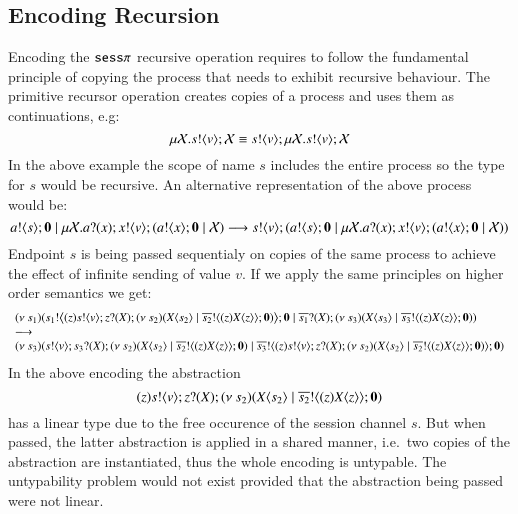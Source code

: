 %

\subsection{Encoding Recursion}
Encoding the $\mathtt{sess}\pi$ recursive operation requires to follow the fundamental
principle of copying the process that needs to exhibit recursive behaviour.
The primitive recursor operation creates copies of a process and uses them
as continuations, e.g:
\[
	\mu \mathcal{X}. s ! \langle v \rangle ; \mathcal{X} \equiv s ! \langle v \rangle ; \mu \mathcal{X}. s ! \langle v \rangle ; \mathcal{X}
\]
In the above example the scope of name $s$ includes the entire process so
the type for $s$ would be recursive. An alternative representation
of the above process would be:
\[
	a ! \langle s \rangle ; \mathbf{0} \;|\; \mu \mathcal{X}. a ? (x) ; x ! \langle v \rangle ; (a ! \langle x \rangle ; \mathbf{0} \;|\; \mathcal{X}) \longrightarrow s ! \langle v \rangle ; (a ! \langle s \rangle ; \mathbf{0} \;|\; \mu \mathcal{X}. a ? (x) ; x ! \langle v \rangle ; (a ! \langle x \rangle ; \mathbf{0} \;|\; \mathcal{X}))
\]
Endpoint $s$ is being passed sequentialy on copies of the 
same process to achieve the effect of infinite sending of value $v$.
If we apply the same principles on higher order semantics we get:
\[
	\begin{array}{l}
	(\nu\ s_1)(s_1 ! \big\langle (z) s ! \langle v \rangle ; z ? (X) ; (\nu\ s_2)(X\langle s_2 \rangle \;|\; \overline{s_2} ! \langle (z) X\langle z \rangle  \rangle ; \mathbf{0})  \big\rangle ; \mathbf{0} \;|\; \overline{s_1} ? (X) ; (\nu\ s_3)(X\langle s_3 \rangle \;|\; \overline{s_3} ! \langle (z) X\langle z \rangle \rangle ; \mathbf{0} ) )
		\\
		\longrightarrow
		\\
		(\nu\ s_3)(s ! \langle v \rangle ; s_3 ? (X) ; (\nu\ s_2)(X\langle s_2 \rangle \;|\; \overline{s_2} ! \langle (z) X\langle z \rangle \rangle ; \mathbf{0}) \;|\; \overline{s_3} ! \langle (z) s ! \langle v \rangle ; z ? (X) ; (\nu\ s_2)(X\langle s_2 \rangle \;|\; \overline{s_2} ! \langle (z) X\langle z \rangle  \rangle ; \mathbf{0})   \rangle ; \mathbf{0} )
	\end{array}
\]
In the above encoding the abstraction
$$(z) s ! \langle v \rangle ; z ? (X) ; (\nu\ s_2)(X\langle s_2 \rangle \;|\; \overline{s_2} ! \langle (z) X\langle z \rangle  \rangle ; \mathbf{0})$$
has a linear type due to the free occurence of the session channel $s$.
But when passed, the latter abstraction is applied in a shared manner, i.e.\ two
copies of the abstraction are instantiated, thus the whole
encoding is untypable. The untypability problem would not exist
provided that the abstraction being passed were not linear.


